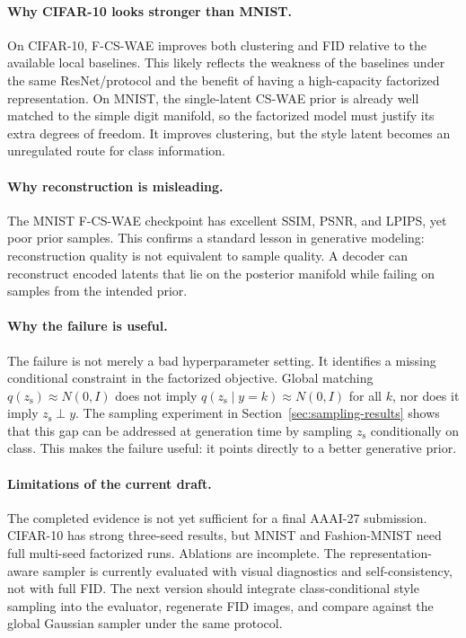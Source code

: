 \documentclass[10pt]{article}
\newcommand{\ours}{F-CS-WAE}
\newcommand{\simple}{CS-WAE}
\newcommand{\zs}{z_{\mathrm{s}}}
\begin{document}
\paragraph{Why CIFAR-10 looks stronger than MNIST.}
On CIFAR-10, \ours{} improves both clustering and FID relative to the available local baselines. This likely reflects the weakness of the baselines under the same ResNet/protocol and the benefit of having a high-capacity factorized representation. On MNIST, the single-latent \simple{} prior is already well matched to the simple digit manifold, so the factorized model must justify its extra degrees of freedom. It improves clustering, but the style latent becomes an unregulated route for class information.

\paragraph{Why reconstruction is misleading.}
The MNIST \ours{} checkpoint has excellent SSIM, PSNR, and LPIPS, yet poor prior samples. This confirms a standard lesson in generative modeling: reconstruction quality is not equivalent to sample quality. A decoder can reconstruct encoded latents that lie on the posterior manifold while failing on samples from the intended prior.

\paragraph{Why the failure is useful.}
The failure is not merely a bad hyperparameter setting. It identifies a missing conditional constraint in the factorized objective. Global matching $q(\zs)\approx N(0,I)$ does not imply $q(\zs\mid y=k)\approx N(0,I)$ for all $k$, nor does it imply $\zs\perp y$. The sampling experiment in Section~\ref{sec:sampling-results} shows that this gap can be addressed at generation time by sampling $\zs$ conditionally on class. This makes the failure useful: it points directly to a better generative prior.

\paragraph{Limitations of the current draft.}
The completed evidence is not yet sufficient for a final AAAI-27 submission. CIFAR-10 has strong three-seed results, but MNIST and Fashion-MNIST need full multi-seed factorized runs. Ablations are incomplete. The representation-aware sampler is currently evaluated with visual diagnostics and self-consistency, not with full FID. The next version should integrate class-conditional style sampling into the evaluator, regenerate FID images, and compare against the global Gaussian sampler under the same protocol.
\end{document}
